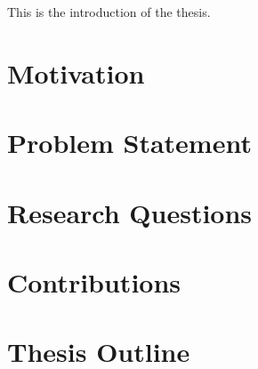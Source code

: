 This is the introduction of the thesis.

\lipsum[1]

\section{Motivation}
\lipsum[2]\parencite{werner2023causal}


\section{Problem Statement}
\lipsum[3]

\section{Research Questions}
\lipsum[3]

\section{Contributions}
\lipsum[3]

\section{Thesis Outline}
\lipsum[3]

